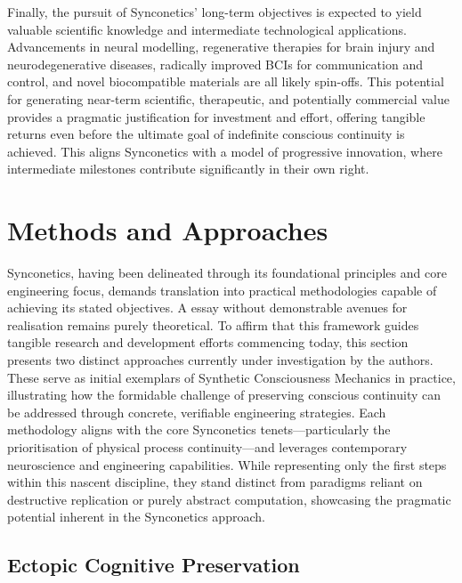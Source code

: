 \documentclass[10pt]{article}
\begin{document}
\begin{sloppypar}
  Finally, the pursuit of Synconetics’ long-term objectives is expected to yield valuable scientific knowledge and intermediate technological applications. Advancements in neural modelling, regenerative therapies for brain injury and neurodegenerative diseases, radically improved BCIs for communication and control, and novel biocompatible materials are all likely spin-offs. This potential for generating near-term scientific, therapeutic, and potentially commercial value provides a pragmatic justification for investment and effort, offering tangible returns even before the ultimate goal of indefinite conscious continuity is achieved. This aligns Synconetics with a model of progressive innovation, where intermediate milestones contribute significantly in their own right.

  \section{Methods and Approaches}
  \label{sec:methods}

  Synconetics, having been delineated through its foundational principles and core engineering focus, demands translation into practical methodologies capable of achieving its stated objectives. A essay without demonstrable avenues for realisation remains purely theoretical. To affirm that this framework guides tangible research and development efforts commencing today, this section presents two distinct approaches currently under investigation by the authors. These serve as initial exemplars of Synthetic Consciousness Mechanics in practice, illustrating how the formidable challenge of preserving conscious continuity can be addressed through concrete, verifiable engineering strategies. Each methodology aligns with the core Synconetics tenets—particularly the prioritisation of physical process continuity—and leverages contemporary neuroscience and engineering capabilities. While representing only the first steps within this nascent discipline, they stand distinct from paradigms reliant on destructive replication or purely abstract computation, showcasing the pragmatic potential inherent in the Synconetics approach.

  \subsection{Ectopic Cognitive Preservation}
  \label{sec:daniel-approach}


\end{sloppypar}
\end{document}
